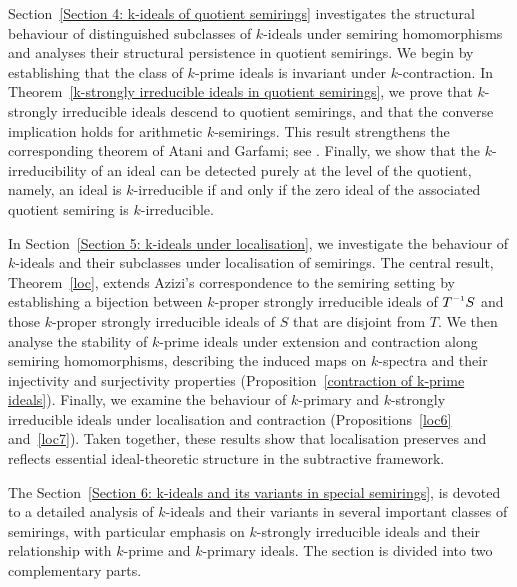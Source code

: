 \documentclass[11pt,leqno]{amsart}
\newcommand{\inv}{^{\raisebox{.2ex}{$\scriptscriptstyle-1$}}}
\theoremstyle{definition}
\numberwithin{equation}{section}
\begin{document}
Section~\ref{Section 4: k-ideals of quotient semirings} investigates the structural behaviour of distinguished subclasses of $k$-ideals under semiring homomorphisms and analyses their structural persistence in quotient semirings. We begin by establishing that the class of $k$-prime ideals is invariant under $k$-contraction. In Theorem~\ref{k-strongly irreducible ideals in quotient semirings}, we prove that $k$-strongly irreducible ideals descend to quotient semirings, and that the converse implication holds for arithmetic $k$-semirings. This result strengthens the corresponding theorem of Atani and Garfami; see \cite[Theorem~2.7]{AtaniGarfami13}. Finally, we show that the $k$-irreducibility of an ideal can be detected purely at the level of the quotient, namely, an ideal is $k$-irreducible if and only if the zero ideal of the associated quotient semiring is $k$-irreducible.

In Section~\ref{Section 5: k-ideals under localisation}, we investigate the behaviour of \(k\)-ideals and their subclasses under localisation of semirings. The central result, Theorem~\ref{loc}, extends Azizi’s correspondence to the semiring setting by establishing a bijection between \(k\)-proper strongly irreducible ideals of \(T\inv S\) and those \(k\)-proper strongly irreducible ideals of \(S\) that are disjoint from \(T\). We then analyse the stability of \(k\)-prime ideals under extension and contraction along semiring homomorphisms, describing the induced maps on \(k\)-spectra and their injectivity and surjectivity properties (Proposition~\ref{contraction of k-prime ideals}). Finally, we examine the behaviour of \(k\)-primary and \(k\)-strongly irreducible ideals under localisation and contraction (Propositions~\ref{loc6} and~\ref{loc7}). Taken together, these results show that localisation preserves and reflects essential ideal-theoretic structure in the subtractive framework.

The Section~\ref{Section 6: k-ideals and its variants in special semirings}, is devoted to a detailed analysis of $k$-ideals and their variants in several important classes of semirings, with particular emphasis on $k$-strongly irreducible ideals and their relationship with $k$-prime and $k$-primary ideals. The section is divided into two complementary parts.
\end{document}
